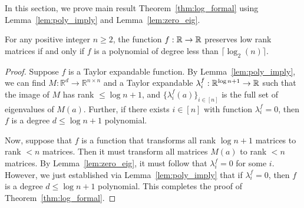 In this section, we prove main result Theorem~\ref{thm:log_formal} using Lemma~\ref{lem:poly_imply} and Lemma~\ref{lem:zero_eig}.

\begin{theorem}\label{thm:log_formal}
For any positive integer $n \geq 2$, the function $f : {\mathbb R} \to {\mathbb R}$ preserves low rank matrices if and only if $f$ is a polynomial of degree less than $\lceil \log_2(n) \rceil$.
\end{theorem} 



\begin{proof} 
Suppose $f$ is a Taylor expandable function. By Lemma~\ref{lem:poly_imply}, we can find $M:\mathbb{R}^d \rightarrow \mathbb{R}^{n \times n}$ and a Taylor expandable $\lambda_i^f:\mathbb{R}^{\log n + 1} \rightarrow {\mathbb R}$ such that the image of $M$ has rank $\leq \log n + 1$, and $\{\lambda_i^f(a)\}_{i \in [n]}$ is the full set of eigenvalues of $M(a)$. Further, if there exists $i \in [n]$ with function $\lambda_i^f = 0$, then $f$ is a degree $d \leq \log n + 1$ polynomial.

Now, suppose that $f$ is a function that transforms all rank $\log n +1$ matrices to rank $<n$ matrices. Then it must transform all matrices $M(a)$ to rank $< n$ matrices. By Lemma~\ref{lem:zero_eig}, it must follow that $\lambda_i^f = 0$ for some $i$. However, we just established via Lemma~\ref{lem:poly_imply} that if $\lambda_i^f = 0$, then $f$ is a degree $d \leq \log n +1$ polynomial. This completes the proof of Theorem~\ref{thm:log_formal}.
\end{proof}

